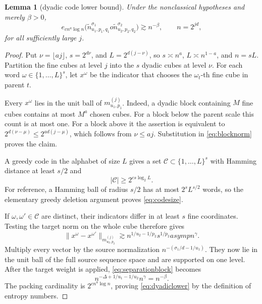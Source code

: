 \documentclass[11pt]{article}
\newtheorem{lemma}[theorem]{Lemma}
\begin{document}
\begin{lemma}[dyadic code lower bound]\label{lem:lower}
Under the nonclassical hypotheses and merely $\beta>0$,
\begin{equation}\label{eq:dyadiclower}
 e_{c n^a\log n}
 \big(\widetilde n^{\sigma_1}_{u_1,p_1,q_1}	o
      \widetilde n^{\sigma_2}_{u_2,p_2,q_2}\big)
 \gtrsim n^{-\beta},
 \qquad n=2^{jd},
\end{equation}
for all sufficiently large $j$.
\end{lemma}

\begin{proof}
Put $\nu=\lfloor aj\rfloor$, $s=2^{d\nu}$, and
$L=2^{d(j-\nu)}$, so $s\asymp n^a$, $L\asymp n^{1-a}$, and $n=sL$.
Partition the fine cubes at level $j$ into the $s$ dyadic cubes at level
$\nu$.  For each word $\omega\in\{1,\ldots,L\}^s$, let $x^\omega$ be the
indicator that chooses the $\omega_t$-th fine cube in parent $t$.

Every $x^\omega$ lies in the unit ball of $m^{(j)}_{u_1,p_1}$.  Indeed, a
dyadic block containing $M$ fine cubes contains at most $M^a$ chosen cubes.
For a block below the parent scale this count is at most one.  For a block
above it the assertion is equivalent to
$2^{d(\nu-\mu)}\le2^{ad(j-\mu)}$, which follows from $\nu\le aj$.
Substitution in \eqref{eq:blocknorm} proves the claim.

A greedy code in the alphabet of size $L$ gives a set
$\mathcal C\subset\{1,\ldots,L\}^s$ with Hamming distance at least $s/2$ and
\begin{equation}\label{eq:codesize}
 |\mathcal C|\ge2^{c s\log_2L}.
\end{equation}
For reference, a Hamming ball of radius $s/2$ has at most
$2^sL^{s/2}$ words, so the elementary greedy deletion argument proves
\eqref{eq:codesize}.

If $\omega,\omega'\in\mathcal C$ are distinct, their indicators differ in
at least $s$ fine coordinates.  Testing the target norm on the whole cube
therefore gives
\begin{equation}\label{eq:separationblock}
 \|x^\omega-x^{\omega'}\|_{m^{(j)}_{u_2,p_2}}
 \gtrsim n^{1/u_2-1/p_2}s^{1/p_2}asymp n^\gamma.
\end{equation}
Multiply every vector by the source normalization
$n^{-(\sigma_1/d-1/u_1)}$.  They now lie in the unit ball of the full source
sequence space and are supported on one level.  After the target weight is
applied, \eqref{eq:separationblock} becomes
\[
 n^{-\Delta+1/u_1-1/u_2}n^\gamma=n^{-\beta}.
\]
The packing cardinality is $2^{c n^a\log n}$, proving
\eqref{eq:dyadiclower} by the definition of entropy numbers.
\end{proof}
\end{document}
